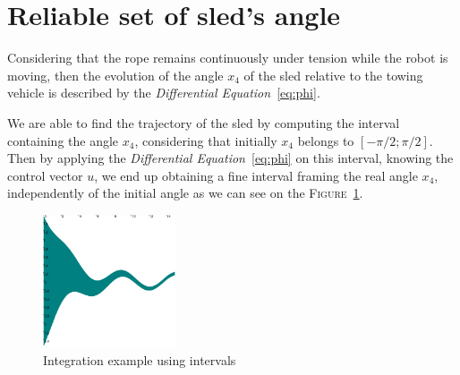 \section*{Reliable set of sled's angle}
    Considering that the rope remains continuously under tension while the robot is moving, then the evolution of the angle $x_4$ of the sled relative to the towing vehicle is described by the \textit{Differential Equation}~\ref{eq:phi}.

    We are able to find the trajectory of the sled by computing the interval containing the angle $x_4$, considering that initially $x_4$ belongs to $[-\pi/2; \pi/2]$. Then by applying the \textit{Differential Equation}~\ref{eq:phi} on this interval, knowing the control vector $u$, we end up obtaining a fine interval framing the real angle $x_4$, independently of the initial angle as we can see on the \textsc{Figure}~\ref{fig:integration}.

    \begin{figure}[!htb]
        \centering
        \includegraphics[width=0.35\textwidth]{imgs/integration_example.png}
        \caption{\label{fig:integration} Integration example using intervals}
    \end{figure}